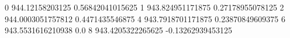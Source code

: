 0 944.12158203125 0.56842041015625
1 943.824951171875 0.27178955078125
2 944.0003051757812 0.4471435546875
4 943.7918701171875 0.23870849609375
6 943.5531616210938 0.0
8 943.4205322265625 -0.13262939453125
